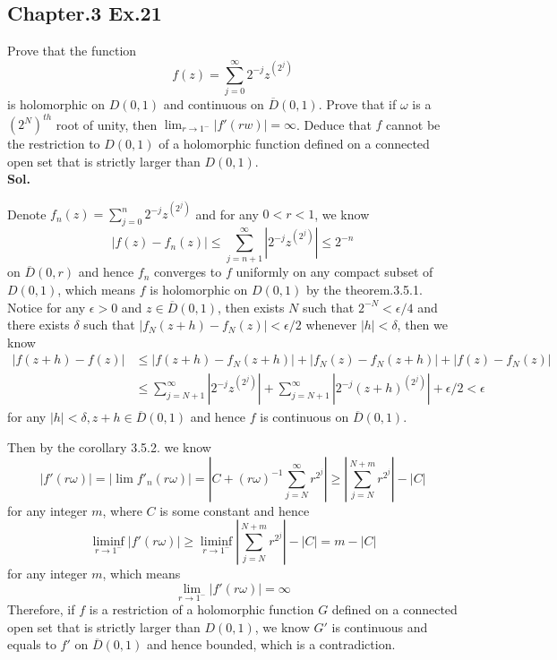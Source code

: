 \documentclass[lang=en,11pt,a4paper,citestyle =authoryear]{elegantpaper}
\begin{document}
\subsection*{Chapter.3 Ex.21} 
Prove that the function
\[
f(z) = \sum\limits_{j=0}^{\infty} 2^{-j}z^{(2^j)}
\]
is holomorphic on $D(0,1)$ and continuous on $\overline{D}(0,1)$. Prove that if $\omega$ is a $(2^N)^{th}$ root of unity, then $\lim_{r\to 1^-}|f'(rw)| = \infty$. Deduce that $f$ cannot be the restriction to $D(0,1)$ of a holomorphic function defined on a connected open set that is strictly larger than $D(0,1)$.
\vspace{0.5em}\\
\textbf{Sol.} \par
Denote $f_n(z) = \sum\limits_{j=0}^n 2^{-j}z^{(2^j)}$ and for any $0<r<1$, we know
\[
|f(z)-f_n(z)| \leq \sum\limits_{j=n+1}^{\infty} |2^{-j} z^{(2^j)}| \leq 2^{-n}
\]
on $\overline{D}(0,r)$ and hence $f_n$ converges to $f$ uniformly on any compact subset of $D(0,1)$, which means $f$ is holomorphic on $D(0,1)$ by the theorem.3.5.1. Notice for any $\epsilon > 0$ and $z\in\overline{D}(0,1)$, then exists $N$ such that $2^{-N}<\epsilon/4$ and there exists $\delta$ such that $|f_N(z+h)-f_N(z)| < \epsilon/2$ whenever $|h| < \delta$, then we know
\[
\begin{aligned}
|f(z+h)-f(z)| &\leq |f(z+h)-f_N(z+h)| + |f_N(z)-f_N(z+h)| + |f(z)-f_N(z)|\\ &\leq \sum\limits_{j=N+1}^{\infty} |2^{-j}z^{(2^j)}| + \sum\limits_{j=N+1}^{\infty} |2^{-j}(z+h)^{(2^j)}| + \epsilon/2 < \epsilon
\end{aligned}
\]
for any $|h|<\delta, z+h \in \overline{D}(0,1)$ and hence $f$ is continuous on $\overline{D}(0,1)$.\par
Then by the corollary 3.5.2. we know
\[
|f'(r\omega)| = |\lim f'_n(r\omega)| = |C+(r\omega)^{-1}\sum\limits_{j=N}^{\infty}r^{2^j}| \geq |\sum\limits_{j=N}^{N+m}r^{2^j}|-|C|
\]
for any integer $m$, where $C$ is some constant and hence
\[
\liminf_{r\to 1^-}|f'(r\omega)| \geq \liminf_{r\to 1^-} |\sum\limits_{j=N}^{N+m}r^{2^j}|-|C| = m - |C|
\]
for any integer $m$, which means
\[
\lim_{r\to 1^-}|f'(r\omega)| = \infty
\]
Therefore, if $f$ is a restriction of a holomorphic function $G$ defined on a connected open set that is strictly larger than $D(0,1)$, we know $G'$ is continuous and equals to $f'$ on $\overline{D}(0,1)$ and hence bounded, which is a contradiction.
\vspace{0.5em}
\end{document}
